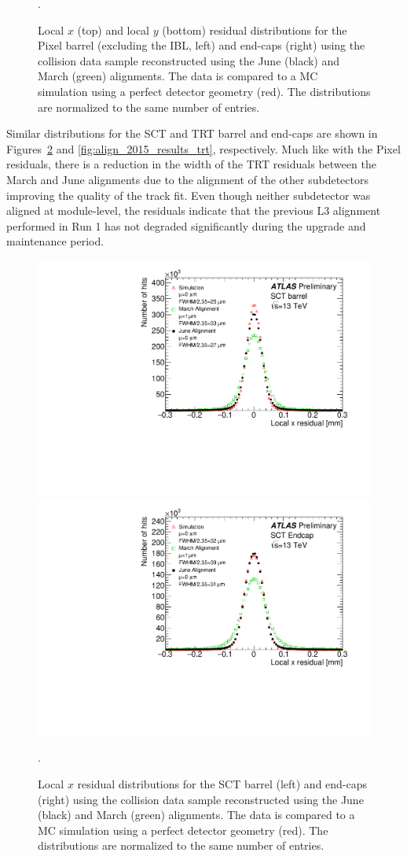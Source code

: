 \begin{figure}[htbp]
  \caption{Local $x$ (top) and local $y$ (bottom) residual distributions for the Pixel barrel (excluding the IBL, left) and end-caps (right) using the  collision data sample reconstructed using the June (black) and March (green) alignments.  The data is compared to a MC simulation using a perfect detector geometry (red).  The distributions are normalized to the same number of entries.}
  \label{fig:align_2015_results_pix}.
\end{figure}

Similar distributions for the SCT and TRT barrel and end-caps are shown in Figures~\ref{fig:align_2015_results_sct} and \ref{fig:align_2015_results_trt}, respectively.
Much like with the Pixel residuals, there is a reduction in the width of the TRT residuals between the March and June alignments due to the alignment of the other subdetectors improving the quality of the track fit.
Even though neither subdetector was aligned at module-level, the residuals indicate that the previous L3 alignment performed in Run 1 has not degraded significantly during the upgrade and maintenance period.

\begin{figure}[htbp]
  \centering
  \includegraphics[width=.48\textwidth]{figs/alignment/align2015/SCTX}
  \includegraphics[width=.48\textwidth]{figs/alignment/align2015/SCTECX}
  \caption{Local $x$ residual distributions for the SCT barrel (left) and end-caps (right) using the  collision data sample reconstructed using the June (black) and March (green) alignments.  The data is compared to a MC simulation using a perfect detector geometry (red).  The distributions are normalized to the same number of entries.}
  \label{fig:align_2015_results_sct}.
\end{figure}

